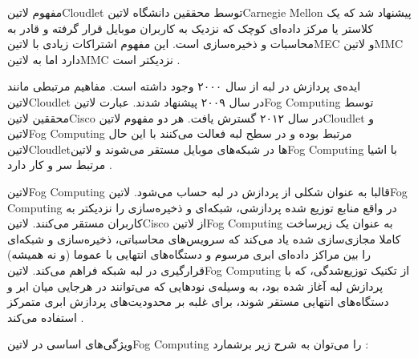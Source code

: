 
مفهوم ‌لاتین{Cloudlet} توسط محققین دانشگاه ‌لاتین{Carnegie Mellon} پیشنهاد شد که یک کلاستر یا مرکز داده‌ای کوچک
که نزدیک به کاربران موبایل قرار گرفته و قادر به محاسبات و ذخیره‌سازی است.
این مفهوم اشتراکات زیادی با ‌لاتین{MEC} و ‌لاتین{MMC} دارد اما به ‌لاتین{MMC} نزدیکتر است
.


ایده‌ی پردازش در لبه از سال ۲۰۰۰ وجود داشته است. مفاهیم مرتبطی مانند ‌لاتین{Cloudlet} در سال ۲۰۰۹ پیشنهاد شدند.
عبارت ‌لاتین{Fog Computing} توسط محققین ‌لاتین{Cisco} در سال ۲۰۱۲ گسترش یافت.
هر دو مفهوم ‌لاتین{Cloudlet} و ‌لاتین{Fog Computing} مرتبط بوده و در سطح لبه فعالت می‌کنند با این حال
‌لاتین{Cloudlet}ها در شبکه‌های موبایل مستقر می‌شوند و ‌لاتین{Fog Computing} با اشیا مرتبط سر و کار دارد
.

‌لاتین{Fog Computing} قالبا به عنوان شکلی از پردازش در لبه حساب می‌شود.
‌لاتین{Fog Computing} در واقع منابع توزیع شده پردازشی، شبکه‌ای و ذخیره‌سازی را نزدیکتر به کاربران مستقر می‌کنند.
‌لاتین{Cisco} از ‌لاتین{Fog Computing} به عنوان یک زیرساخت کاملا مجازی‌سازی شده یاد می‌کند که سرویس‌های محاسباتی، ذخیره‌سازی و شبکه‌ای
را بین مراکز داده‌ای ابری مرسوم و دستگاه‌های انتهایی با عموما (و نه همیشه) قرارگیری در لبه شبکه فراهم می‌کند.
‌لاتین{Fog Computing} از تکنیک توزیع‌شدگی، که با پردازش لبه آغاز شده بود، به وسیله‌ی نودهایی که
می‌توانند در هرجایی میان ابر و دستگاه‌های انتهایی مستقر شوند،
برای غلبه بر محدودیت‌های پردازش ابری متمرکز استفاده می‌کند
.


ویژگی‌های اساسی در ‌لاتین{Fog Computing} را می‌توان به شرح زیر برشمارد
:

